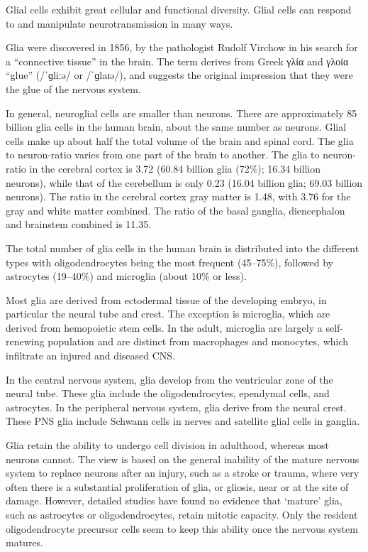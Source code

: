\documentclass[]{book}
\begin{document}
Glial cells exhibit great cellular and functional diversity. Glial cells can respond to and manipulate neurotransmission in many ways.

Glia were discovered in 1856, by the pathologist Rudolf Virchow in his search for a ``connective tissue'' in the brain. The term derives from Greek γλία and γλοία ``glue'' (/ˈɡliːə/ or /ˈɡlaɪə/), and suggests the original impression that they were the glue of the nervous system.

In general, neuroglial cells are smaller than neurons. There are approximately 85 billion glia cells in the human brain, about the same number as neurons. Glial cells make up about half the total volume of the brain and spinal cord. The glia to neuron-ratio varies from one part of the brain to another. The glia to neuron-ratio in the cerebral cortex is 3.72 (60.84 billion glia (72\%); 16.34 billion neurons), while that of the cerebellum is only 0.23 (16.04 billion glia; 69.03 billion neurons). The ratio in the cerebral cortex gray matter is 1.48, with 3.76 for the gray and white matter combined. The ratio of the basal ganglia, diencephalon and brainstem combined is 11.35.

The total number of glia cells in the human brain is distributed into the different types with oligodendrocytes being the most frequent (45--75\%), followed by astrocytes (19--40\%) and microglia (about 10\% or less).

Most glia are derived from ectodermal tissue of the developing embryo, in particular the neural tube and crest. The exception is microglia, which are derived from hemopoietic stem cells. In the adult, microglia are largely a self-renewing population and are distinct from macrophages and monocytes, which infiltrate an injured and diseased CNS.

In the central nervous system, glia develop from the ventricular zone of the neural tube. These glia include the oligodendrocytes, ependymal cells, and astrocytes. In the peripheral nervous system, glia derive from the neural crest. These PNS glia include Schwann cells in nerves and satellite glial cells in ganglia.

Glia retain the ability to undergo cell division in adulthood, whereas most neurons cannot. The view is based on the general inability of the mature nervous system to replace neurons after an injury, such as a stroke or trauma, where very often there is a substantial proliferation of glia, or gliosis, near or at the site of damage. However, detailed studies have found no evidence that `mature' glia, such as astrocytes or oligodendrocytes, retain mitotic capacity. Only the resident oligodendrocyte precursor cells seem to keep this ability once the nervous system matures.
\end{document}
